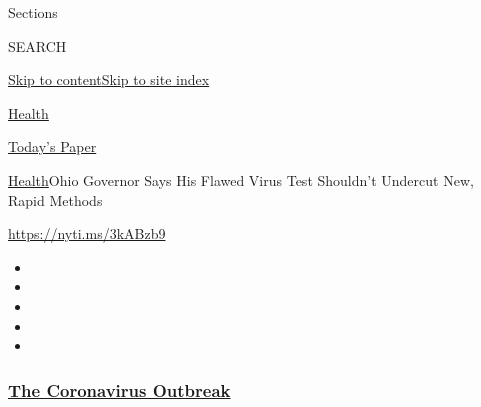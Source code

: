 Sections

SEARCH

\protect\hyperlink{site-content}{Skip to
content}\protect\hyperlink{site-index}{Skip to site index}

\href{https://www.nytimes3xbfgragh.onion/section/health}{Health}

\href{https://myaccount.nytimes3xbfgragh.onion/auth/login?response_type=cookie\&client_id=vi}{}

\href{https://www.nytimes3xbfgragh.onion/section/todayspaper}{Today's
Paper}

\href{/section/health}{Health}\textbar{}Ohio Governor Says His Flawed
Virus Test Shouldn't Undercut New, Rapid Methods

\url{https://nyti.ms/3kABzb9}

\begin{itemize}
\item
\item
\item
\item
\item
\end{itemize}

\hypertarget{the-coronavirus-outbreak}{%
\subsubsection{\texorpdfstring{\href{https://www.nytimes3xbfgragh.onion/news-event/coronavirus?name=styln-coronavirus-national\&region=TOP_BANNER\&block=storyline_menu_recirc\&action=click\&pgtype=Article\&impression_id=ec19cb00-f4b6-11ea-8c84-813730b6829b\&variant=undefined}{The
Coronavirus
Outbreak}}{The Coronavirus Outbreak}}\label{the-coronavirus-outbreak}}

